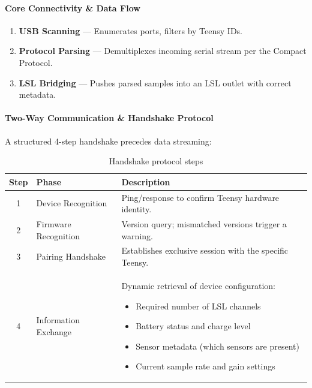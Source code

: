 \documentclass[11pt,a4paper]{article}
\begin{document}
\paragraph{Core Connectivity \& Data Flow}

\begin{enumerate}
    \item \textbf{USB Scanning} — Enumerates ports, filters by Teensy IDs.
    \item \textbf{Protocol Parsing} — Demultiplexes incoming serial stream
          per the Compact Protocol.
    \item \textbf{LSL Bridging} — Pushes parsed samples into an LSL outlet
          with correct metadata.
\end{enumerate}

\paragraph{Two-Way Communication \& Handshake Protocol}

A structured 4-step handshake precedes data streaming:

\begin{table}[H]
\centering
\caption{Handshake protocol steps}
\label{tab:handshake-steps}
\begin{tabularx}{\textwidth}{c l X}
\toprule
\textbf{Step} & \textbf{Phase} & \textbf{Description} \\
\midrule
1 & Device Recognition
  & Ping/response to confirm Teensy hardware identity. \\
2 & Firmware Recognition
  & Version query; mismatched versions trigger a warning. \\
3 & Pairing Handshake
  & Establishes exclusive session with the specific Teensy. \\
4 & Information Exchange
  & Dynamic retrieval of device configuration:
    \begin{itemize}[nosep, leftmargin=1em]
        \item Required number of LSL channels
        \item Battery status and charge level
        \item Sensor metadata (which sensors are present)
        \item Current sample rate and gain settings
    \end{itemize} \\
\bottomrule
\end{tabularx}
\end{table}
\end{document}

